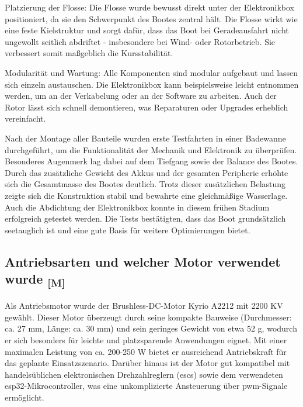 \documentclass[a4paper,12pt]{article}
\begin{document}
Platzierung der Flosse: Die Flosse wurde bewusst direkt unter der Elektronikbox positioniert, da sie den Schwerpunkt des Bootes zentral hält. Die Flosse wirkt wie eine feste Kielstruktur und sorgt dafür, dass das Boot bei Geradeausfahrt nicht ungewollt seitlich abdriftet - insbesondere bei Wind- oder Rotorbetrieb. Sie verbessert somit maßgeblich die Kursstabilität.\newline

Modularität und Wartung: Alle Komponenten sind modular aufgebaut und lassen sich einzeln austauschen. Die Elektronikbox kann beispielsweise leicht entnommen werden, um an der Verkabelung oder an der Software zu arbeiten. Auch der Rotor lässt sich schnell demontieren, was Reparaturen oder Upgrades erheblich vereinfacht.


Nach der Montage aller Bauteile wurden erste Testfahrten in einer Badewanne durchgeführt, um die Funktionalität der Mechanik und Elektronik zu überprüfen. Besonderes Augenmerk lag dabei auf dem Tiefgang sowie der Balance des Bootes. Durch das zusätzliche Gewicht des Akkus und der gesamten Peripherie erhöhte sich die Gesamtmasse des Bootes deutlich. Trotz dieser zusätzlichen Belastung zeigte sich die Konstruktion stabil und bewahrte eine gleichmäßige Wasserlage. Auch die Abdichtung der Elektronikbox konnte in diesem frühen Stadium erfolgreich getestet werden. Die Tests bestätigten, dass das Boot grundsätzlich seetauglich ist und eine gute Basis für weitere Optimierungen bietet.



\newpage
\subsection{\texorpdfstring{Antriebsarten und welcher Motor verwendet wurde \textsubscript{[M]}}{Antriebsarten und welcher Motor verwendet wurde [M]}}
\label{sec:Antriebsarten}

Als Antriebsmotor wurde der Brushless-DC-Motor Kyrio A2212 mit 2200 KV gewählt. Dieser Motor überzeugt durch seine kompakte Bauweise (Durchmesser: ca. 27 mm, Länge: ca. 30 mm) und sein geringes Gewicht von etwa 52 g, wodurch er sich besonders für leichte und platzsparende Anwendungen eignet. Mit einer maximalen Leistung von ca. 200-250 W bietet er ausreichend Antriebskraft für das geplante Einsatzszenario. Darüber hinaus ist der Motor gut kompatibel mit handelsüblichen elektronischen Drehzahlreglern (\gls{esc}s) sowie dem verwendeten \gls{esp32}-Mikrocontroller, was eine unkomplizierte Ansteuerung über \gls{pwm}-Signale ermöglicht.\cite{Brushless_DC}
\end{document}
